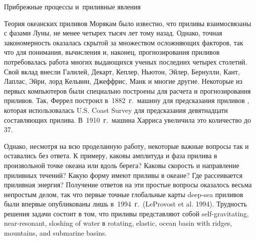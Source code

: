 \begin{chapter}{Прибрежные процессы и~приливные явления}
\begin{section}{Теория океанских приливов}
Морякам было известно, что приливы взаимосвязаны с фазами Луны,
не менее четырех тысяч лет тому назад. Однако, точная закономерность
оказалась скрытой за множеством осложняющих факторов, так что для понимания,
вычисления и, наконец, прогнозирования приливов потребовалась работа многих
выдающихся ученых последних четырех столетий. Свой вклад внесли Галилей,
Декарт, Кеплер, Ньютон, Эйлер, Бернулли, Кант, Лаплас, Эйри, 
лорд Кельвин, Джеффрис, Манк и многие другие. 
Некоторые из первых компьютеров были специально построены для расчета
и прогнозирования приливов. Так, Феррел построил в~1882~г.\ машину для
предсказания приливов%
, 
которая использовалась U.S. Coast Survey для предсказания девятнадцати 
составляющих прилива.
В~1910~г.\ машина Харриса%
увеличила это количество до 37.
%

Однако, несмотря на всю проделанную работу, некоторые важные вопросы так
и оставались без ответа. К примеру, каковы амплитуда и фаза прилива в 
произвольной точке океана или вдоль берега? Каковы скорость и направление
приливных течений? Какую форму имеют приливы в океане? 
Где рассеивается приливная энергия? 
Получение ответов на эти простые вопросы оказалось весьма непростым делом,
так что первые точные глобальные карты deep-sea приливов были
впервые опубликованы лишь в~1994~г.\ (LeProvost et al. 1994). 
Трудность решения задачи состоит в том, что приливы представляют собой
self-gravitating, near-resonant, sloshing of water 
в rotating, elastic, ocean basin with ridges, mountains, and submarine
basins.
%


\end{section}
\end{chapter}
